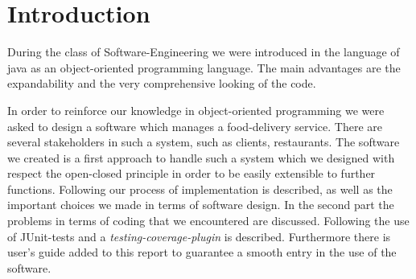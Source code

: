 \section{Introduction}
During the class of Software-Engineering we were introduced in the language of java as an object-oriented 
programming language. The main advantages are the expandability and the very comprehensive looking of 
the code.

In order to reinforce our knowledge in object-oriented programming we were asked to design a software
which manages a food-delivery service. There are several stakeholders in such a system, such as 
clients, restaurants. The software we created is a first approach to handle such a system which we
designed with respect the open-closed principle in order to be easily extensible to further functions.
Following our process of implementation is described, as well as the important choices we made in 
terms of software design. In the second part the problems in terms of coding that we encountered are 
discussed. Following the use of JUnit-tests and a \textit{testing-coverage-plugin} is described.
Furthermore there is user's guide added to this report to guarantee a smooth entry in the use of the
software.

